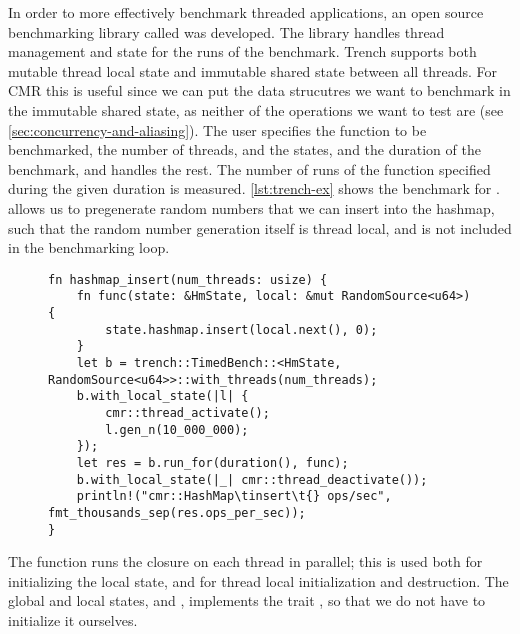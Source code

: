 In order to more effectively benchmark threaded applications, an open source benchmarking library
called \cite{trench} was developed. The library handles thread management and state
for the runs of the benchmark. Trench supports both mutable thread local state and immutable shared
state between all threads. For CMR this is useful since we can put the data strucutres we want to
benchmark in the immutable shared state, as neither of the operations we want to test are
 (see \cref{sec:concurrency-and-aliasing}). The user specifies the function to be
benchmarked, the number of threads, and the states, and the duration of the benchmark, and
 handles the rest. The number of runs of the function specified during the given
duration is measured.  \cref{lst:trench-ex} shows the benchmark for .
 allows us to pregenerate random numbers that we can insert into the hashmap,
such that the random number generation itself is thread local, and is not included in the
benchmarking loop.

\begin{figure}[ht]
\begin{lstlisting}[label=lst:trench-ex,caption=\code{Hashmap::insert} benchmark using \code{trench}]
fn hashmap_insert(num_threads: usize) {
    fn func(state: &HmState, local: &mut RandomSource<u64>) {
        state.hashmap.insert(local.next(), 0);
    }
    let b = trench::TimedBench::<HmState, RandomSource<u64>>::with_threads(num_threads);
    b.with_local_state(|l| {
        cmr::thread_activate();
        l.gen_n(10_000_000);
    });
    let res = b.run_for(duration(), func);
    b.with_local_state(|_| cmr::thread_deactivate());
    println!("cmr::HashMap\tinsert\t{} ops/sec", fmt_thousands_sep(res.ops_per_sec));
}
\end{lstlisting}
\end{figure}

The  function runs the closure on each thread in parallel; this is used both
for initializing the local state, and for thread local initialization and destruction.
The global and local states,  and , implements the trait
, so that we do not have to initialize it ourselves.
